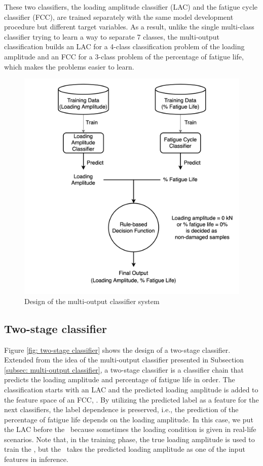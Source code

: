These two classifiers, the loading amplitude classifier (LAC) and the fatigue cycle classifier (FCC), are trained separately with the same model development procedure but different target variables. As a result, unlike the single multi-class classifier trying to learn a way to separate 7 classes, the multi-output classification builds an LAC for a 4-class classification problem of the loading amplitude and an FCC for a 3-class problem of the percentage of fatigue life, which makes the problems easier to learn.

\begin{figure}[tb]
    \centering
    \includegraphics[width=0.9\linewidth]{fig/multi-ouput_classifier.png}
    \caption{Design of the multi-output classifier system}
    \label{fig: multi-output classifier}
\end{figure}

\subsection{Two-stage classifier}
Figure \ref{fig: two-stage classifier} shows the design of a two-stage classifier. Extended from the idea of the multi-output classifier presented in Subsection \ref{subsec: multi-output classifier}, a two-stage classifier is a classifier chain \cite{classifier-chain-READ2007} that predicts the loading amplitude and percentage of fatigue life in order. The classification starts with an LAC and the predicted loading amplitude is added to the feature space of an FCC, \fcctwo. By utilizing the predicted label as a feature for the next classifiers, the label dependence is preserved, i.e., the prediction of the percentage of fatigue life depends on the loading amplitude. In this case, we put the LAC before the \fcctwo \  because sometimes the loading condition is given in real-life scenarios. Note that, in the training phase, the true loading amplitude is used to train the \fcctwo, but the \fcctwo \ takes the predicted loading amplitude as one of the input features in inference.

